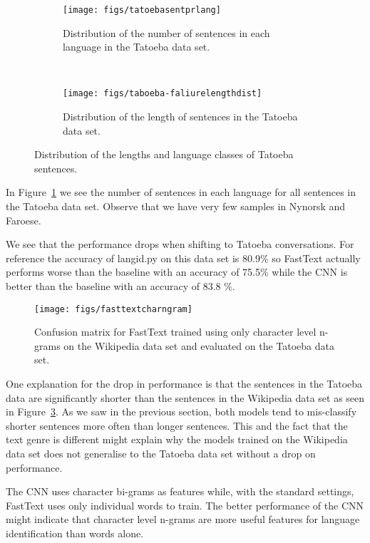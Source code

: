 \documentclass[11pt,a4paper]{article}
\begin{document}
\begin{figure}
    \centering
    \begin{subfigure}[b]{0.45\textwidth}
      \texttt{[image: figs/tatoebasentprlang]}
      \caption{Distribution of the number of sentences in each language in the Tatoeba data set.}
      \label{tatoebasentprlang}
    \end{subfigure}
    ~
    \begin{subfigure}[b]{0.45\textwidth}
      \texttt{[image: figs/taboeba-faliurelengthdist]}
      \caption{Distribution of the length of sentences in the Tatoeba data set.}
      \label{tatoebalengths}
    \end{subfigure}
    \caption{Distribution of the lengths and language classes of Tatoeba sentences.}
\end{figure}

In Figure~\ref{tatoebasentprlang} we see the number of sentences in each language for all sentences in the Tatoeba data set. Observe that we have very few samples in Nynorsk and Faroese.

We see that the performance drops when shifting to Tatoeba conversations. For reference the accuracy of langid.py on this data set is 80.9\% so FastText actually performs worse than the baseline with an accuracy of 75.5\% while the CNN is better than the baseline with an accuracy of 83.8 \%.


\begin{figure}
    \centering
    \texttt{[image: figs/fasttextcharngram]}
    \caption{Confusion matrix for FastText trained using only character level n-grams on the Wikipedia data set and evaluated on the Tatoeba data set.}
    \label{fasttextcharngram}
\end{figure}



One explanation for the drop in performance is that the sentences in the Tatoeba data are significantly shorter than the sentences in the Wikipedia data set as seen in Figure~\ref{tatoebalengths}. As we saw in the previous section, both models tend to mis-classify shorter sentences more often than longer sentences. This and the fact that the text genre is different might explain why the models trained on the Wikipedia data set does not generalise to the Tatoeba data set without a drop on performance.

The CNN uses character bi-grams as features while, with the standard settings, FastText uses only individual words to train. The better performance of the CNN might indicate that character level n-grams are more useful features for language identification than words alone.
\end{document}
